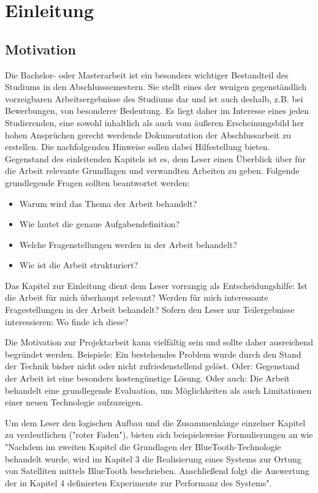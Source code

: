 
\chapter{Einleitung}

\section{Motivation}

Die Bachelor- oder Masterarbeit ist ein besonders wichtiger Bestandteil des Studiums in den Abschlusssemestern. Sie stellt
eines der wenigen gegenständlich vorzeigbaren Arbeitsergebnisse des Studiums dar und ist auch deshalb, z.B.
bei Bewerbungen, von besonderer Bedeutung. Es liegt daher im Interesse eines jeden Studierenden, eine
sowohl inhaltlich als auch vom äußeren Erscheinungsbild her hohen Ansprüchen gerecht werdende
Dokumentation der Abschlussarbeit zu erstellen. Die nachfolgenden Hinweise sollen dabei Hilfestellung bieten.\\

Gegenstand des einleitenden Kapitels ist es, dem Leser einen Überblick über für die Arbeit relevante Grundlagen und verwandten Arbeiten zu geben. Folgende grundlegende Fragen sollten beantwortet werden:
\begin{itemize}
	\item Warum wird das Thema der Arbeit behandelt? 
	\item Wie lautet die genaue Aufgabendefinition?
	\item Welche Fragenstellungen werden in der Arbeit behandelt?	
	\item Wie ist die Arbeit strukturiert?  
\end{itemize}

Das Kapitel zur Einleitung dient dem Leser vorrangig als Entscheidungshilfe: Ist die Arbeit für mich überhaupt relevant? Werden für mich interessante Fragestellungen in der Arbeit behandelt? Sofern den Leser nur Teilergebnisse interessieren: Wo finde ich diese?

Die Motivation zur Projektarbeit kann vielfältig sein und sollte daher ausreichend begründet werden. Beispiele: Ein bestehendes Problem wurde durch den Stand der Technik bisher nicht oder nicht zufriedenstellend gelöst. Oder: Gegenstand der Arbeit ist eine besonders kostengünstige Lösung. Oder auch: Die Arbeit behandelt eine grundlegende Evaluation, um Möglichkeiten als auch Limitationen einer neuen Technologie aufzuzeigen.

Um dem Leser den logischen Aufbau und die Zusammenhänge einzelner Kapitel zu verdeutlichen ("roter Faden"), bieten sich beispielsweise Formulierungen an wie "Nachdem im zweiten Kapitel die Grundlagen der BlueTooth-Technologie behandelt wurde, wird im Kapitel 3 die Realisierung eines Systems zur Ortung von Satelliten mittels BlueTooth beschrieben. Anschließend folgt die Auswertung der in Kapitel 4 definierten Experimente zur Performanz des Systems".

